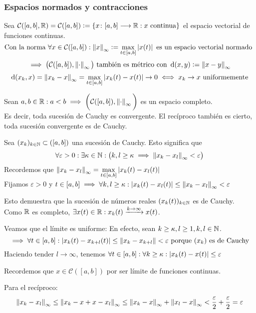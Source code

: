 \subsubsection{Espacios normados y contracciones}
Sea $\mathcal{C}([a,b], \mathbb{R})=\mathcal{C}([a,b]) \vcentcolon= \left\{x \colon [a,b] \longrightarrow \mathbb{R} : x\text{ continua}\right\}$ el espacio vectorial de funciones continuas.
\[\text{Con la norma }\forall x \in \mathcal{C}([a,b]) : \left\Vert x\right\Vert_{\infty} \vcentcolon= \max_{t\in [a,b]} \left|x(t)\right| \text{ es un espacio vectorial normado }\]
\[\implies \big(\mathcal{C}([a,b]), \left\Vert\cdot\right\Vert_\infty\big) \text{ también es métrico con } \operatorname{d}(x,y)\vcentcolon=\left\Vert x-y\right\Vert_\infty\]
\[\operatorname{d}(x_k, x) = \left\Vert x_k-x\right\Vert_\infty=\max_{t\in [a,b]} \left|x_k(t)-x(t)\right| \rightarrow0 \iff x_k\to x \text{ uniformemente}\]
\begin{teo}
	Sean $a, b \in \mathbb{R} : a<b \implies \displaystyle \bigg(\mathcal{C}([a,b]), \left\Vert\cdot\right\Vert_\infty\bigg)$ es un espacio completo.\\Es decir, toda sucesión de Cauchy es convergente. El recíproco también es cierto, toda sucesión convergente es de Cauchy.
	\begin{dem}
		Sea $(x_k)_{k\in \mathbb{N}}\subset \mathcal([a,b])$ una sucesión de Cauchy. Esto significa que
		\[\forall \varepsilon > 0 : \exists \kappa \in \mathbb{N} : \big(k, l\geq \kappa \implies \left\Vert x_k-x_l\right\Vert_\infty <\varepsilon\big) \]
		Recordemos que $\displaystyle \left\Vert x_k-x_l\right\Vert_\infty = \max_{t\in[a,b]}\left|x_k(t)-x_l(t)\right|$\\
		Fijamos $\varepsilon > 0$ y $\displaystyle t\in [a,b] \implies \forall k, l \geq \kappa : \left|x_k(t) - x_l(t)\right| \leq \left\Vert x_k-x_l\right\Vert_\infty < \varepsilon$

		Esto demuestra que la sucesión de números reales $(x_k(t))_{k\in\mathbb{N}}$ es de Cauchy. \\
		Como $\mathbb{R}$ es completo, $\exists x(t) \in \mathbb{R} : x_k(t) \xrightarrow{k\to\infty} x(t)$.

		Veamos que el límite es uniforme: En efecto, sean $k\geq \kappa, l \geq 1, k, l \in \mathbb{N}$.
		\[\implies \forall t \in [a,b] : \left|x_k(t)-x_{k+l}(t)\right| \leq \left\Vert x_k-x_{k+l}\right\Vert < \varepsilon \text{ porque $(x_k)$ es de Cauchy}\]
		Haciendo tender $l\to\infty$, tenemos $\displaystyle \forall t \in [a,b] : \forall k \geq \kappa : \left|x_k(t)-x(t)\right|\leq \varepsilon$

		Recordemos que $x\in\mathcal{C}([a,b])$ por ser límite de funciones continuas.

		Para el recíproco:
		\[\left\Vert x_k-x_l\right\Vert_\infty \leq \left\Vert x_k-x+x-x_l\right\Vert_\infty \leq \left\Vert x_k-x\right\Vert_\infty + \left\Vert x_l-x\right\Vert_\infty < \frac{\varepsilon}{2} + \frac{\varepsilon}{2} = \varepsilon\]
	\end{dem}
\end{teo}
